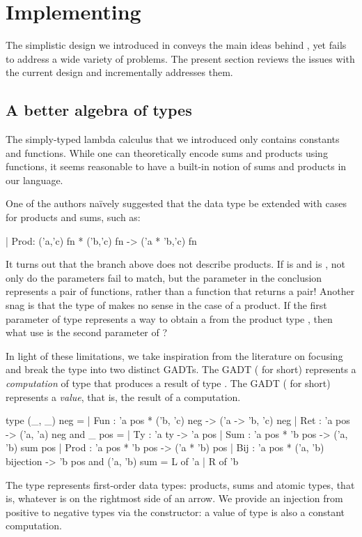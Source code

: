 \section{Implementing \arti}
\label{sec:representation}

The simplistic design we introduced in  conveys the main ideas
behind \arti, yet fails to address a wide variety of problems. The present section
reviews the issues with the current design and incrementally addresses them.

\subsection{A better algebra of types}
\label{sec:algebra}

The simply-typed lambda calculus that we introduced only contains constants and
functions. While one can theoretically encode sums and products using functions,
it seems reasonable to have a built-in notion of sums and products in our
language.

One of the authors naïvely suggested that the data type be extended with cases
for products and sums, such as:
%
\begin{ocamlcode}
| Prod: ('a,'c) fn * ('b,'c) fn -> ('a * 'b,'c) fn
\end{ocamlcode}
%
It turns out that the branch above does not describe products. If  is
 and  is , not only do the
 parameters fail to match, but the  parameter in the
conclusion represents a pair of functions, rather than a function that returns a
pair! Another snag is that the type of  makes no sense in the case of
a product. If the first parameter of type  represents a way to
obtain a  from the product type , then what use is the second
parameter of ?

In light of these limitations, we take inspiration from the literature on
focusing and break the  type into two distinct GADTs.
  The GADT  ( for short) represents a
    \emph{computation} of type  that produces a result of type
    .
  The GADT  ( for short) represents a
    \emph{value}, that is, the result of a computation.
%
\begin{ocamlcode}
type (_, _) neg =
| Fun : 'a pos * ('b, 'c) neg -> ('a -> 'b, 'c) neg
| Ret : 'a pos -> ('a, 'a) neg
and _ pos =
| Ty : 'a ty -> 'a pos
| Sum : 'a pos * 'b pos -> ('a, 'b) sum pos
| Prod : 'a pos  * 'b pos -> ('a * 'b) pos
| Bij : 'a pos * ('a, 'b) bijection -> 'b pos
and ('a, 'b) sum = L of 'a | R of 'b
\end{ocamlcode}
%
The  type represents first-order data types: products, sums and atomic
types, that is, whatever is on the rightmost side of an arrow. We provide an
injection from positive to negative types via the  constructor: a
value of type  is also a constant computation.

